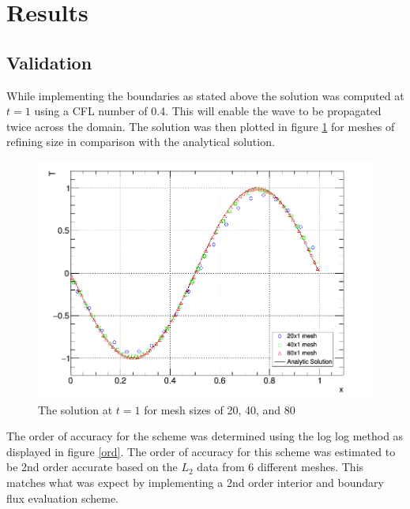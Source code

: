 \documentclass[paper=a4, fontsize=11pt, abstract=on]{scrartcl}
\numberwithin{equation}{section}		%
\numberwithin{figure}{section}			%
\numberwithin{table}{section}				%
\begin{document}
\section{Results}
\subsection{Validation}
While implementing the boundaries as stated above the solution was computed at $t=1$ using a CFL number of 0.4. This will enable the wave to be propagated twice across the domain. The solution was then plotted in figure \ref{q4} for meshes of refining size in comparison with the analytical solution.

\begin{figure}[H]
\centering
\includegraphics[width=0.85\linewidth]{qq11}
\caption{The solution at $t=1$ for mesh sizes of 20, 40, and 80}
\label{q4}
\end{figure}

The order of accuracy for the scheme was determined using the log log method as displayed in figure \ref{ord}. The order of accuracy for this scheme was estimated to be 2nd order accurate based on the $L_2$ data from 6 different meshes. This matches what was expect by implementing a 2nd order interior and boundary flux evaluation scheme.
\end{document}
